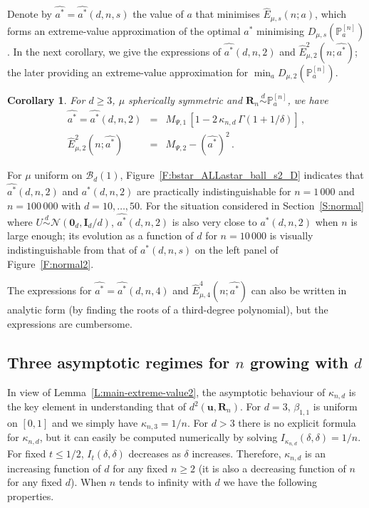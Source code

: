 \documentclass{article}
\def\Ib{\mathbf{I}}
\def\simd{\stackrel{d}{\sim}}
\def\PP{\mathbb{P}}
\def\SB{{\mathscr B}}
\def\0b{\mathbf{0}}
\newcommand{\be}{\begin{eqnarray}}
\newcommand{\ee}{\end{eqnarray}}
\def\Rb{\mathbf{R}}
\def\ub{\mathbf{u}}
\def\SN{{\mathcal N}}
\newtheorem{corollary}{Corollary}[section]
\begin{document}
Denote by $\widehat {a^*}=\widehat {a^*}(d,n,s)$ the value of $a$ that minimises $\widehat E_{\mu,s}(n;a)$, which forms an extreme-value approximation of the optimal $a^*$ minimising $D_{\mu,s}(\PP_a^{[n]})$. In the next corollary, we give the expressions of $\widehat {a^*}(d,n,2)$ and $\widehat E_{\mu,2}^2(n;\widehat {a^*})$; the later providing an extreme-value approximation for $\min_a D_{\mu,2}(\PP_a^{[n]})$.

\begin{corollary}\label{Coro:astar-s2-Pa}
For $d\geq 3$, $\mu$ spherically symmetric and $\Rb_n\simd \PP_a^{[n]}$, we have
\be
\widehat {a^*} = \widehat {a^*}(d,n,2) &=& M_{\Psi,1}\,\left[ 1 - 2\,\kappa_{n,d}\,\Gamma(1+1/\delta) \right]\,, \label{hat_a_2} \\
\widehat E_{\mu,2}^2(n;\widehat {a^*}) &=& M_{\Psi,2} - (\widehat {a^*})^2 \,. \nonumber
\ee
\end{corollary}

For $\mu$ uniform on $\SB_d(1)$, Figure~\ref{F:bstar_ALLastar_ball_s2_D} indicates that $\widehat {a^*}(d,n,2)$ and $a^*(d,n,2)$ are practically indistinguishable for $n=1\,000$ and $n=100\,000$ with $d=10,\ldots,50$.
For the situation considered in Section~\ref{S:normal} where $U\simd\SN(\0b_d,\Ib_d/d)$, $\widehat {a^*}(d,n,2)$ is also very close to $a^*(d,n,2)$ when $n$ is large enough; its evolution as a function of $d$ for $n=10\,000$ is visually indistinguishable from that of $a^*(d,n,s)$ on the left panel of Figure~\ref{F:normal2}.

The expressions for $\widehat {a^*} =\widehat {a^*}(d,n,4)$ and $\widehat E_{\mu,4}^4(n;\widehat {a^*})$ can also be written in analytic form (by finding the roots of a third-degree polynomial), but the expressions are cumbersome.

\subsection{Three asymptotic regimes for $n$ growing with $d$}\label{S:n-growing-with-d}

In view of Lemma~\ref{L:main-extreme-value2}, the asymptotic behaviour of $\kappa_{n,d}$ is the key element in understanding that of $d^2(\ub,\Rb_n)$. For $d=3$, $\beta_{1,1}$ is uniform on $[0,1]$ and we simply have $\kappa_{n,3}=1/n$. For $d>3$ there is no explicit formula for $\kappa_{n,d}$, but it can easily be computed numerically by solving $I_{\kappa_{n,d}}(\delta,\delta)=1/n$. For fixed $t\leq 1/2$, $I_t(\delta,\delta)$ decreases as $\delta$ increases. Therefore, $\kappa_{n,d}$ is an increasing function of $d$ for any fixed $n\geq 2$ (it is also a decreasing function of $n$ for any fixed $d$). When $n$ tends to infinity with $d$ we have the following properties.
\end{document}
